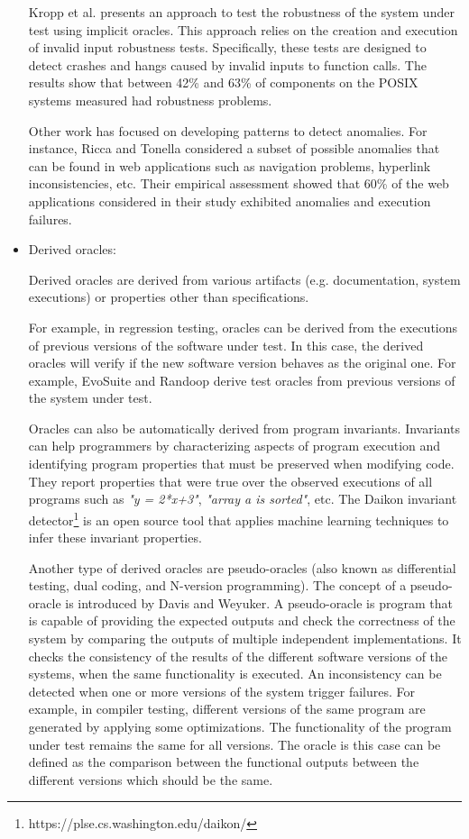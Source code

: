 \begin{itemize}
	Kropp et al.\cite{kropp1998automated} presents an approach to test the robustness of the system under test using implicit oracles.
	This approach relies on the creation and execution of invalid input robustness tests. Specifically, these tests are designed to detect crashes and hangs caused by invalid inputs to function calls. The results show that between 42\% and 63\% of components on the POSIX systems measured had robustness problems. 
	
	Other work has focused on developing patterns to detect anomalies. For instance, Ricca and Tonella\cite{ricca2006detecting} considered a subset of possible anomalies that can be found in web applications such as navigation problems, hyperlink inconsistencies, etc. Their empirical assessment
	showed that 60\% of the web applications considered in their study exhibited anomalies and execution failures.
	
	
	\item Derived oracles:
	
	Derived oracles are derived from various artifacts (e.g. documentation, system executions) or properties other than specifications.
	
	For example, in regression testing, oracles can be derived from the executions of previous versions of the software under test. In this case, the derived oracles will verify if the new software version behaves as the original one\cite{mariani2007compatibility}. For example, EvoSuite and Randoop derive test oracles from previous versions of the system under test.
	
	Oracles can also be automatically derived from program invariants\cite{ernst2000quickly}. Invariants can help programmers by characterizing aspects of program execution and identifying program properties that must be preserved when modifying code. They report properties that were true over the observed executions of all programs such as \textit{"y = 2*x+3"}, \textit{"array a is sorted"}, etc. The Daikon invariant detector\footnote{https://plse.cs.washington.edu/daikon/} is an open source tool that applies machine learning techniques to infer these invariant properties.
	
	Another type of derived oracles are pseudo-oracles (also known as differential testing, dual coding, and N-version programming\cite{patrick2016testing}). 
	The concept of a pseudo-oracle is introduced by Davis and Weyuker\cite{davis1981pseudo}.
	A pseudo-oracle is program that is capable of providing the expected outputs and check the correctness of the system by comparing the outputs of multiple independent implementations. 
	It checks the consistency of the results of the different software versions of the systems, when the same functionality is executed. An inconsistency can be detected when one or more versions of the system trigger failures. 
	For example, in compiler testing, different versions of the same program are generated by applying some optimizations. The functionality of the program under test remains the same for all versions. The oracle is this case can be defined as the comparison between the functional outputs between the different versions which should be the same\cite{yang2011finding}.
	

\end{itemize}
